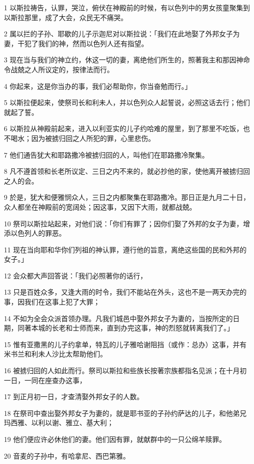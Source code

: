 \par 1 以斯拉祷告，认罪，哭泣，俯伏在神殿前的时候，有以色列中的男女孩童聚集到以斯拉那里，成了大会，众民无不痛哭。
\par 2 属以拦的子孙、耶歇的儿子示迦尼对以斯拉说：「我们在此地娶了外邦女子为妻，干犯了我们的神，然而以色列人还有指望。
\par 3 现在当与我们的神立约，休这一切的妻，离绝他们所生的，照著我主和那因神命令战兢之人所议定的，按律法而行。
\par 4 你起来，这是你当办的事，我们必帮助你，你当奋勉而行。」
\par 5 以斯拉便起来，使祭司长和利未人，并以色列众人起誓说，必照这话去行；他们就起了誓。
\par 6 以斯拉从神殿前起来，进入以利亚实的儿子约哈难的屋里，到了那里不吃饭，也不喝水；因为被掳归回之人所犯的罪，心里悲伤。
\par 7 他们通告犹大和耶路撒冷被掳归回的人，叫他们在耶路撒冷聚集。
\par 8 凡不遵首领和长老所议定、三日之内不来的，就必抄他的家，使他离开被掳归回之人的会。
\par 9 於是，犹大和便雅悯众人，三日之内都聚集在耶路撒冷。那日正是九月二十日，众人都坐在神殿前的宽阔处；因这事，又因下大雨，就都战兢。
\par 10 祭司以斯拉站起来，对他们说：「你们有罪了；因你们娶了外邦的女子为妻，增添以色列人的罪恶。
\par 11 现在当向耶和华你们列祖的神认罪，遵行他的旨意，离绝这些国的民和外邦的女子。」
\par 12 会众都大声回答说：「我们必照著你的话行，
\par 13 只是百姓众多，又逢大雨的时令，我们不能站在外头，这也不是一两天办完的事，因我们在这事上犯了大罪；
\par 14 不如为全会众派首领办理。凡我们城邑中娶外邦女子为妻的，当按所定的日期，同著本城的长老和士师而来，直到办完这事，神的烈怒就转离我们了。」
\par 15 惟有亚撒黑的儿子约拿单，特瓦的儿子雅哈谢阻挡（或作：总办）这事，并有米书兰和利未人沙比太帮助他们。
\par 16 被掳归回的人如此而行。祭司以斯拉和些族长按著宗族都指名见派；在十月初一日，一同在座查办这事，
\par 17 到正月初一日，才查清娶外邦女子的人数。
\par 18 在祭司中查出娶外邦女子为妻的，就是耶书亚的子孙约萨达的儿子，和他弟兄玛西雅、以利以谢、雅立、基大利；
\par 19 他们便应许必休他们的妻。他们因有罪，就献群中的一只公绵羊赎罪。
\par 20 音麦的子孙中，有哈拿尼、西巴第雅。

